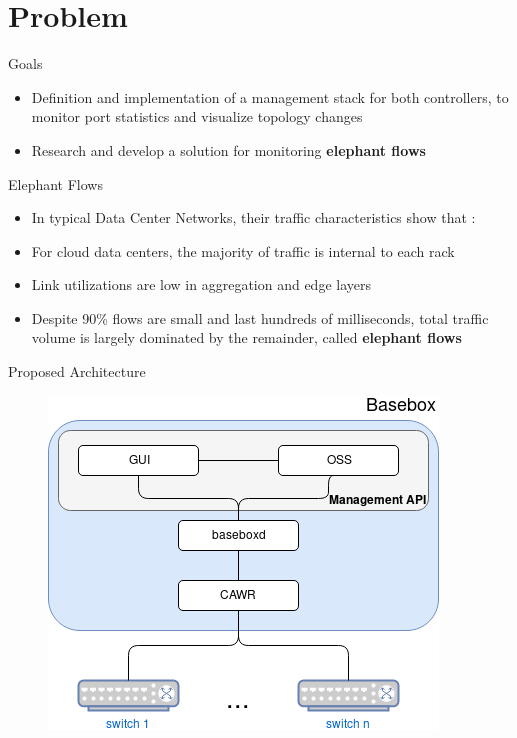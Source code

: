 \documentclass{beamer}
\begin{document}
\section{Problem}

\begin{frame}{Goals}
    \begin{itemize}
        \item Definition and implementation of a management stack for both controllers, to monitor port statistics and visualize topology changes
            \pause 
        \item Research and develop a solution for monitoring \textbf{elephant flows}
    \end{itemize}
\end{frame}

\begin{frame}{Elephant Flows}
    \begin{itemize}
        \item In typical Data Center Networks, their traffic characteristics show that \cite{mori_identifying_2004}:
            \pause
        \item For cloud data centers, the majority of traffic is internal to each rack
            \pause
        \item Link utilizations are low in aggregation and edge layers
            \pause
        \item Despite 90\% flows are small and last hundreds of milliseconds, total traffic volume is largely dominated by the remainder, called 
            \textbf{elephant flows} \cite{benson_network_2010}
    \end{itemize}
\end{frame}

\begin{frame}{Proposed Architecture}
        \begin{figure}
            \includegraphics[width=.7\textwidth]{proposed_work/proposed_system}
        \end{figure}
\end{frame}
\end{document}
